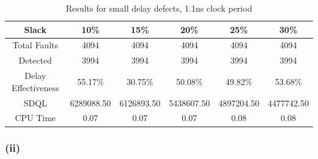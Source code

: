 \documentclass[letterpaper]{article} %
\begin{document}
\begin{table}[ht]
\centering
\begin{tabular}{|c|c|c|c|c|c|}
\hline
Slack               & 10\%            & 15\%             & 20\%            & 25\%             & 30\%            \\ \hline
Total Faults        & 4094            & 4094             & 4094            & 4094             & 4094            \\ \hline
Detected            & 3994            & 3994             & 3994            & 3994             & 3994            \\ \hline
Delay Effectiveness & 55.17\% & 30.75\% & 50.08\% & 49.82\% & 53.68\% \\ \hline
SDQL                & 6289088.50      & 6126893.50       & 5438607.50      & 4897204.50       & 4477742.50      \\ \hline
CPU Time            & 0.07            & 0.07             & 0.07            & 0.08             & 0.08            \\ \hline
\end{tabular}
\caption{Results for small delay defects, 1.1ns clock period}
\end{table}


\newpage

\subsubsection*{(ii)}
\end{document}
